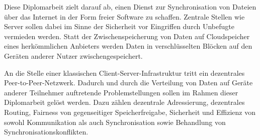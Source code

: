 Diese Diplomarbeit zielt darauf ab, einen Dienst zur Synchronisation von Dateien
über das Internet in der Form freier Software zu schaffen. Zentrale Stellen wie
Server sollen dabei im Sinne der Sicherheit vor Eingriffen durch Unbefugte
vermieden werden. Statt der Zwischenspeicherung von Daten auf Cloudspeicher
eines herkömmlichen Anbieters werden Daten in verschlüsselten Blöcken auf den
Geräten anderer Nutzer zwischengespeichert.

An die Stelle einer klassischen Client-Server-Infrastruktur tritt ein
dezentrales Peer-to-Peer-Netzwerk. Dadurch und durch die Verteilung von Daten
auf Geräte anderer Teilnehmer auftretende Problemstellungen sollen im Rahmen
dieser Diplomarbeit gelöst werden. Dazu zählen dezentrale Adressierung,
dezentrales Routing, Fairness von gegenseitiger Speicherfreigabe, Sicherheit
und Effizienz von sowohl Kommunikation als auch Synchronisation sowie Behandlung
von Synchronisationskonflikten.
